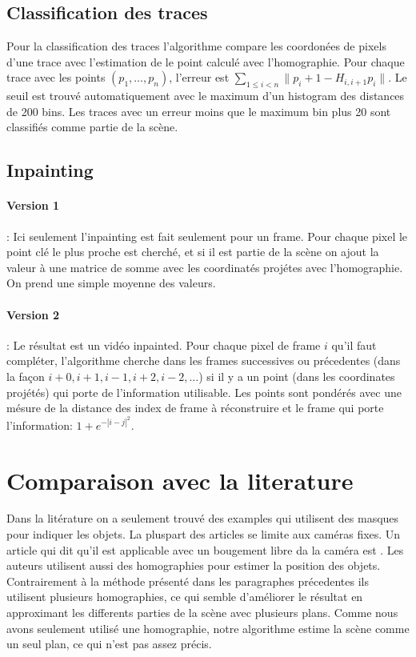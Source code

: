 \documentclass[8pt,twoside=off,titlepage=false, twocolumn]{scrartcl}
\begin{document}
\subsection{Classification des traces}

Pour la classification des traces l'algorithme compare les coordonées de pixels d'une trace avec l'estimation de le point calculé avec l'homographie. Pour chaque trace avec les points $(p_1, \dots, p_n)$, l'erreur est $\sum_{1\le i < n} \| p_i+1 - H_{i, i+1} p_{i} \|$. Le seuil est trouvé automatiquement avec le maximum d'un histogram des distances de 200 bins. Les traces avec un erreur moins que le maximum bin plus 20 sont classifiés comme partie de la scène.

\subsection{Inpainting}

\paragraph{Version 1} : Ici seulement l'inpainting est fait seulement pour un frame. Pour chaque pixel le point clé le plus proche est cherché, et si il est partie de la scène on ajout la valeur à une matrice de somme avec les coordinatés projétes avec l'homographie. On prend une simple moyenne des valeurs.

\paragraph{Version 2} : Le résultat est un vidéo inpainted. Pour chaque pixel de frame $i$ qu'il faut compléter, l'algorithme cherche dans les frames successives ou précedentes (dans la façon $i+0, i+1, i-1, i+2, i-2, \dots$) si il y a un point (dans les coordinates projétés) qui porte de l'information utilisable. Les points sont pondérés avec une mésure de la distance des index de frame à réconstruire et le frame qui porte l'information: $1+e^{-|i-j|^2}$.

\section{Comparaison avec la literature}

Dans la litérature on a seulement trouvé des examples qui utilisent des masques pour indiquer les objets. La pluspart des articles se limite aux caméras fixes. Un article qui dit qu'il est applicable avec un bougement libre da la caméra est \cite{background-inpainting}. Les auteurs utilisent aussi des homographies pour estimer la position des objets. Contrairement à la méthode présenté dans les paragraphes précedentes ils utilisent plusieurs homographies, ce qui semble d'améliorer le résultat en approximant les differents parties de la scène avec plusieurs plans. Comme nous avons seulement utilisé une homographie, notre algorithme estime la scène comme un seul plan, ce qui n'est pas assez précis.


    
    
\end{document}
